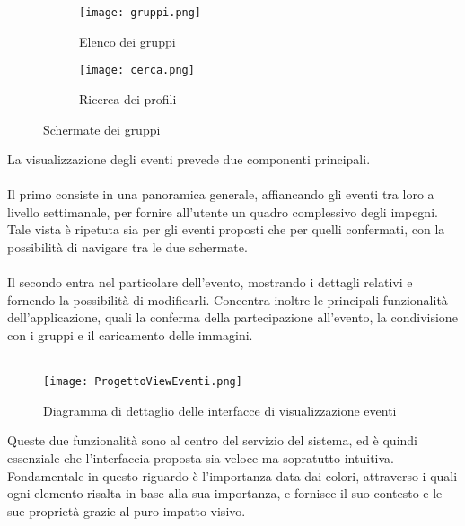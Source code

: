 \begin{figure}[htbp]
    \centering
    \begin{subfigure}{0.49\textwidth}
        \centering
        \texttt{[image: gruppi.png]}
        \caption{Elenco dei gruppi}
    \end{subfigure}
    \hfill
    \begin{subfigure}{0.49\textwidth}
        \centering
        \texttt{[image: cerca.png]}
        \caption{Ricerca dei profili}
    \end{subfigure}
    \caption{Schermate dei gruppi}
\end{figure}


\clearpage

La visualizzazione degli eventi prevede due componenti principali.\\
\\
Il primo consiste in una panoramica generale, affiancando gli eventi tra loro a livello settimanale,
per fornire all'utente un quadro complessivo degli impegni. 
Tale vista è ripetuta sia per gli eventi proposti che per quelli confermati, 
con la possibilità di navigare tra le due schermate.\\
\\
Il secondo entra nel particolare dell'evento, 
mostrando i dettagli relativi e fornendo la possibilità di modificarli. 
Concentra inoltre le principali funzionalità dell'applicazione, 
quali la conferma della partecipazione all'evento, la condivisione con i gruppi e il caricamento delle immagini.\\
\\

\begin{figure}[h!]
    \begin{center}
        \texttt{[image: ProgettoViewEventi.png]}
        \caption{Diagramma di dettaglio delle interfacce di visualizzazione eventi}
    \end{center}
\end{figure}
\clearpage

Queste due funzionalità sono al centro del servizio del sistema, 
ed è quindi essenziale che l'interfaccia proposta sia veloce ma sopratutto intuitiva.
Fondamentale in questo riguardo è l'importanza data dai colori, attraverso i quali
ogni elemento risalta in base alla sua importanza, e fornisce il suo contesto e le sue proprietà 
grazie al puro impatto visivo.\\
\\



